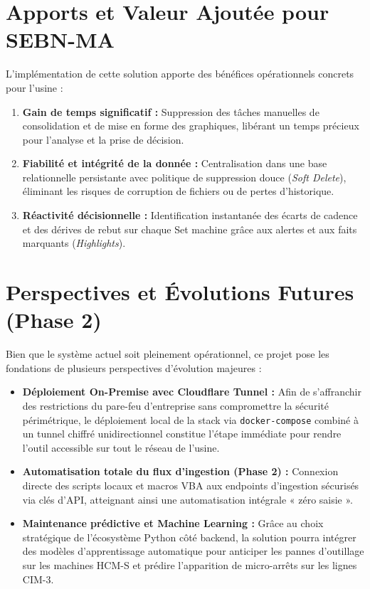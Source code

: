 \section*{Apports et Valeur Ajoutée pour SEBN-MA}
L'implémentation de cette solution apporte des bénéfices opérationnels concrets pour l'usine :
\begin{enumerate}
    \item \textbf{Gain de temps significatif :} Suppression des tâches manuelles de consolidation et de mise en forme des graphiques, libérant un temps précieux pour l'analyse et la prise de décision.
    \item \textbf{Fiabilité et intégrité de la donnée :} Centralisation dans une base relationnelle persistante avec politique de suppression douce (\textit{Soft Delete}), éliminant les risques de corruption de fichiers ou de pertes d'historique.
    \item \textbf{Réactivité décisionnelle :} Identification instantanée des écarts de cadence et des dérives de rebut sur chaque Set machine grâce aux alertes et aux faits marquants (\textit{Highlights}).
\end{enumerate}

\section*{Perspectives et Évolutions Futures (Phase 2)}
Bien que le système actuel soit pleinement opérationnel, ce projet pose les fondations de plusieurs perspectives d'évolution majeures :
\begin{itemize}
    \item \textbf{Déploiement On-Premise avec Cloudflare Tunnel :} Afin de s'affranchir des restrictions du pare-feu d'entreprise sans compromettre la sécurité périmétrique, le déploiement local de la stack via \texttt{docker-compose} combiné à un tunnel chiffré unidirectionnel constitue l'étape immédiate pour rendre l'outil accessible sur tout le réseau de l'usine.
    \item \textbf{Automatisation totale du flux d'ingestion (Phase 2) :} Connexion directe des scripts locaux et macros VBA aux endpoints d'ingestion sécurisés via clés d'API, atteignant ainsi une automatisation intégrale « zéro saisie ».
    \item \textbf{Maintenance prédictive et Machine Learning :} Grâce au choix stratégique de l'écosystème Python côté backend, la solution pourra intégrer des modèles d'apprentissage automatique pour anticiper les pannes d'outillage sur les machines HCM-S et prédire l'apparition de micro-arrêts sur les lignes CIM-3.
\end{itemize}

